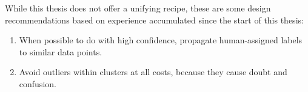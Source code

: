 While this thesis does not offer a unifying recipe, these are some design recommendations based on experience accumulated since the start of this thesis:
\begin{enumerate}
\item When possible to do with high confidence, propagate human-assigned labels to similar data points.%
\item Avoid outliers within clusters at all costs, because they cause doubt and confusion. 
\end{enumerate}





\begin{comment}
\section{Human Evaluator Consistency Issues}


Clustering python solutions has a strong subjective component. In early pilot studies, python programming teachers given the same set of solutions partitioned the space of solutions in a variety of ways, producing different numbers and/or compositions of clusters. \todo{add glassman at scale poster info and citation} Since teachers found multiple reasonable clusterings, the pilot results can be explained by one or both of the following reasons: (1) Teachers have different internal clustering metrics. (2) Given a clustering metric, solutions can still belong to multiple clusters.

It is also reasonable to assume that, given additional solutions to the same programming problem, some solutions would fall into existing clusters and some would represent wholly new solution successes or failures. It is reasonable to assume there is not some true total number of clusters that one reaches if one sees enough data.
\end{comment}




